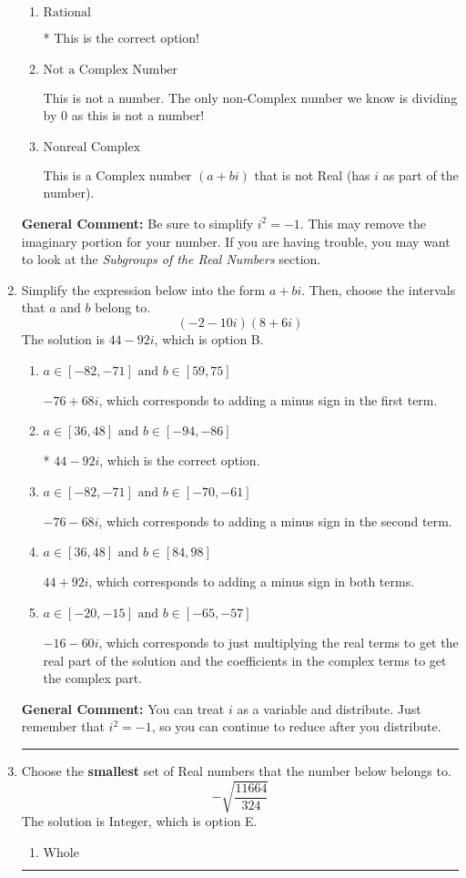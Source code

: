 \documentclass{extbook}[14pt]
\newcommand{\litem}[1]{\item #1

\rule{\textwidth}{0.4pt}}
\begin{document}
\begin{enumerate}
{\begin{enumerate}[label=\Alph*.]
This is a Complex number $(a+bi)$ that \textbf{only} has an imaginary part like $2i$.
\item \( \text{Rational} \)

* This is the correct option!
\item \( \text{Not a Complex Number} \)

This is not a number. The only non-Complex number we know is dividing by 0 as this is not a number!
\item \( \text{Nonreal Complex} \)

This is a Complex number $(a+bi)$ that is not Real (has $i$ as part of the number).
\end{enumerate}

\textbf{General Comment:} Be sure to simplify $i^2 = -1$. This may remove the imaginary portion for your number. If you are having trouble, you may want to look at the \textit{Subgroups of the Real Numbers} section.
}
\litem{
Simplify the expression below into the form $a+bi$. Then, choose the intervals that $a$ and $b$ belong to.
\[ (-2 - 10 i)(8 + 6 i) \]The solution is \( 44 - 92 i \), which is option B.\begin{enumerate}[label=\Alph*.]
\item \( a \in [-82, -71] \text{ and } b \in [59, 75] \)

 $-76 + 68 i$, which corresponds to adding a minus sign in the first term.
\item \( a \in [36, 48] \text{ and } b \in [-94, -86] \)

* $44 - 92 i$, which is the correct option.
\item \( a \in [-82, -71] \text{ and } b \in [-70, -61] \)

 $-76 - 68 i$, which corresponds to adding a minus sign in the second term.
\item \( a \in [36, 48] \text{ and } b \in [84, 98] \)

 $44 + 92 i$, which corresponds to adding a minus sign in both terms.
\item \( a \in [-20, -15] \text{ and } b \in [-65, -57] \)

 $-16 - 60 i$, which corresponds to just multiplying the real terms to get the real part of the solution and the coefficients in the complex terms to get the complex part.
\end{enumerate}

\textbf{General Comment:} You can treat $i$ as a variable and distribute. Just remember that $i^2=-1$, so you can continue to reduce after you distribute.
}
\litem{
Choose the \textbf{smallest} set of Real numbers that the number below belongs to.
\[ -\sqrt{\frac{11664}{324}} \]The solution is \( \text{Integer} \), which is option E.\begin{enumerate}[label=\Alph*.]
\item \( \text{Whole} \)


\end{enumerate}}
\end{enumerate}
\end{document}
